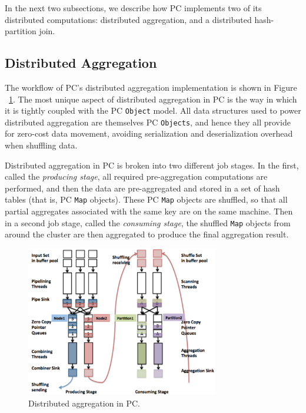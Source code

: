 In the next two subsections, we describe how PC implements two of its distributed computations: distributed aggregation, and a distributed hash-partition join.

\subsection{Distributed Aggregation}

The workflow of PC's distributed aggregation implementation is
shown in Figure ~\ref{fig:aggregation}.
The most unique aspect of distributed aggregation in PC is the way in which it is tightly coupled with the PC \texttt{Object} model.  All data structures used
to power distributed aggregation are themselves PC \texttt{Objects}, and hence they all provide for zero-cost data movement, avoiding
serialization and deserialization overhead when shuffling data.

Distributed aggregation in PC is broken into two different job stages.  In the first, called the \emph{producing stage},
all required pre-aggregation computations are performed, and then the
data are pre-aggregated and stored in a set of hash tables (that is, PC \texttt{Map} objects).  These PC \texttt{Map} objects are shuffled, so that all partial aggregates
associated with the same key are on the same machine.  Then in a second job stage, called the \emph{consuming stage},
the shuffled \texttt{Map} objects from around the cluster are then aggregated
to produce the final aggregation result.

\begin{figure}
\centering
\includegraphics[width=0.75\textwidth]{aggregation.pdf}
  \caption{\label{fig:aggregation} Distributed aggregation in PC.}
\end{figure}


